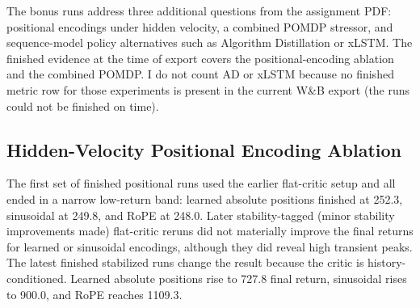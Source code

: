 \documentclass[11pt]{article}
\begin{document}
The bonus runs address three additional questions from the assignment PDF: positional encodings under hidden velocity, a combined POMDP stressor, and sequence-model policy alternatives such as Algorithm Distillation or xLSTM. The finished evidence at the time of export covers the positional-encoding ablation and the combined POMDP. I do not count AD or xLSTM because no finished metric row for those experiments is present in the current W\&B export (the runs could not be finished on time).

\subsection{Hidden-Velocity Positional Encoding Ablation}

The first set of finished positional runs used the earlier flat-critic setup and all ended in a narrow low-return band: learned absolute positions finished at 252.3, sinusoidal at 249.8, and RoPE at 248.0. Later stability-tagged (minor stability improvements made) flat-critic reruns did not materially improve the final returns for learned or sinusoidal encodings, although they did reveal high transient peaks. The latest finished stabilized runs change the result because the critic is history-conditioned. Learned absolute positions rise to 727.8 final return, sinusoidal rises to 900.0, and RoPE reaches 1109.3.

\begin{table}[!htbp]
\centering
\scriptsize
\caption{Bonus positional ablation under hidden velocity. The latest selected row is the newest finished run for each exact stabilized experiment name.}
\label{tab:bonus-positional}
\end{table}
\end{document}
